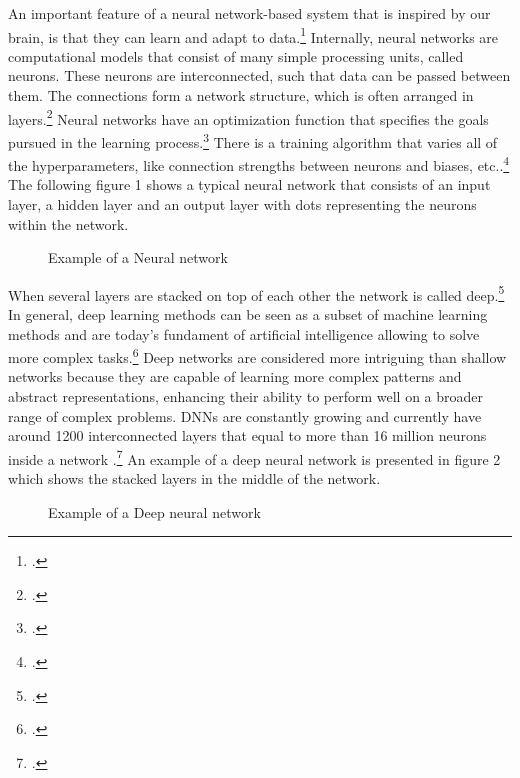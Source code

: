 An important feature of a neural network-based system that is inspired by our brain, is that they can learn and adapt to data.\footcite[cf.][305]{cichyDeepNeuralNetworks2019}
Internally, neural networks are computational models that consist of many simple processing units, called neurons.
These neurons are interconnected, such that data can be passed between them.
The connections form a network structure, which is often arranged in layers.\footcite[cf.][305]{cichyDeepNeuralNetworks2019}
Neural networks have an optimization function that specifies the goals pursued in the learning process.\footcite[cf.][1583]{durstewitzDeepNeuralNetworks2019}
There is a training algorithm that varies all of the hyperparameters, like connection strengths between neurons and biases, etc..\footcite[cf.][1583]{durstewitzDeepNeuralNetworks2019}
The following figure 1 shows a typical neural network that consists of an input layer, a hidden layer and an output layer with dots representing the neurons within the network.
\begin{figure}[H]
    \centering
    \caption{Example of a Neural network}
\end{figure}
When several layers are stacked on top of each other the network is called deep.\footcite[cf.][305]{cichyDeepNeuralNetworks2019}
In general, deep learning methods can be seen as a subset of machine learning methods and are today's fundament of artificial intelligence allowing to solve more complex tasks.\footcite[cf.][1583]{durstewitzDeepNeuralNetworks2019}
Deep networks are considered more intriguing than shallow networks because they are capable of learning more complex patterns and abstract representations, enhancing their ability to perform well on a broader range of complex problems.
\ac{DNN}s are constantly growing and currently have around 1200 interconnected layers that equal to more than 16 million neurons inside a network .\footcite[cf.][2]{mallComprehensiveReviewDeep2023}
An example of a deep neural network is presented in figure 2 which shows the stacked layers in the middle of the network.
\begin{figure}[H]
    \centering
    \caption{Example of a Deep neural network}
\end{figure}

